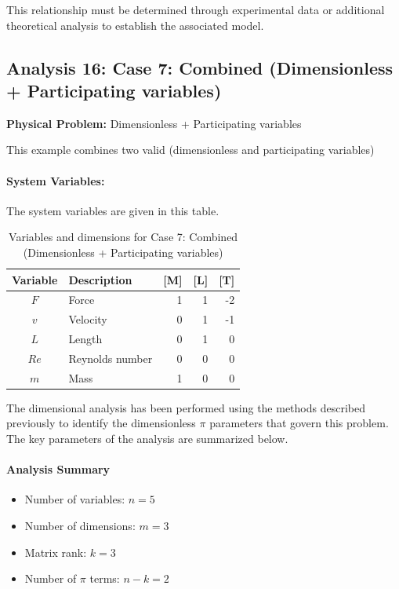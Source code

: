                     This relationship must be determined through experimental data or additional theoretical analysis to establish the associated model.


\subsection{Analysis 16: Case 7: Combined (Dimensionless + Participating variables)}
\label{sec:Case_7_Combined_Dimensionless__Participating_variables}

\begin{problembox}
\textbf{Physical Problem:} Dimensionless + Participating variables
\end{problembox}

This example combines two valid (dimensionless and participating variables)

\paragraph{System Variables: } The system variables are given in this table.

\begin{table}[H]
\centering
\begin{tabular}{|c|l|r|r|r|}
\hline
\textbf{Variable} & \textbf{Description} & \textbf{[M]} & \textbf{[L]} & \textbf{[T]} \\
\hline
$F$ & Force & 1 & 1 & -2 \\
$v$ & Velocity & 0 & 1 & -1 \\
$L$ & Length & 0 & 1 & 0 \\
$Re$ & Reynolds number & 0 & 0 & 0 \\
$m$ & Mass & 1 & 0 & 0 \\

\hline
\end{tabular}
\caption{Variables and dimensions for Case 7: Combined (Dimensionless + Participating variables)}
\end{table}

The dimensional analysis has been performed using the methods described previously to identify the dimensionless $\pi$ parameters that govern this problem. The key parameters of the analysis are summarized below.

\paragraph{Analysis Summary}
\begin{itemize}
\item Number of variables: $n = 5$
\item Number of dimensions: $m = 3$
\item Matrix rank: $k = 3$
\item Number of $\pi$ terms: $n - k = 2$
\end{itemize}


